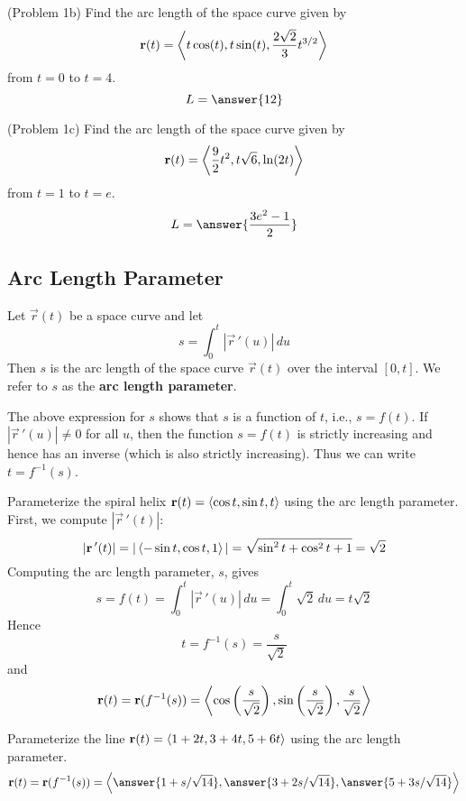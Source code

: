 \documentclass[handout]{ximera}
\begin{document}
\begin{problem}(Problem 1b)
Find the arc length of the space curve given by
\[
\mathbf r(t) = \left\langle t\cos(t), t\sin(t), \frac{2\sqrt 2}{3} t^{3/2}\right\rangle
\]
from $ t= 0$ to $t = 4$.
\[
L = \answer{12}
\]
\end{problem}


\begin{problem}(Problem 1c)
Find the arc length of the space curve given by
\[
\mathbf r(t) = \left\langle \frac92 t^2, t\sqrt 6, \ln(2t)\right\rangle
\]
from $ t= 1$ to $t = e$.
\[
L = \answer{\frac{3e^2 -1}{2}}
\]
\end{problem}




\subsection{Arc Length Parameter}

Let $\vec r(t) $ be a space curve and let 
\[
s = \int_0^t |\vec r\,'(u)| \, du
\]
Then $s$ is the arc length of the space curve $\vec r(t)$ over the interval $[0, t]$.
We refer to $s$ as the \textbf{arc length parameter}.

The above expression for $s$ shows that $s$ is a function of $t$, i.e., $s = f(t)$.
If $|\vec r\,'(u)| \neq 0$ for all $u$, then the function $s = f(t)$ is strictly increasing and hence has an inverse (which is also strictly increasing).
Thus we can write $t = f^{-1}(s)$.

\begin{example}[Example 2]
Parameterize the spiral helix $\mathbf r(t) = \left\langle \cos t, \sin t, t\right\rangle$ using the arc length parameter.\\
First, we compute $|\vec r\,'(t)|$:
\[
|\mathbf r\,'(t)| = |\left\langle -\sin t, \cos t, 1\right\rangle| = \sqrt{\sin^2 t + \cos^2 t + 1} = \sqrt 2
\]
Computing the arc length parameter, $s$, gives
\[
s = f(t) = \int_0^t |\vec r\,'(u)| \, du = \int_0^t \sqrt 2 \, du = t \sqrt 2
\]
Hence
\[
t = f^{-1}(s) = \frac{s}{\sqrt 2}
\]
and 
\[
\mathbf r(t) = \mathbf r(f^{-1}(s)) = \left\langle \cos \left(\frac{s}{\sqrt 2}\right), \sin \left(\frac{s}{\sqrt 2}\right),\frac{s}{\sqrt 2}\right\rangle
\]
\end{example}


\begin{problem}[Problem 2]
Parameterize the line $\mathbf r(t) =\left\langle 1+2t, 3+4t, 5+6t\right\rangle$ using the arc length parameter.
\[
\vec r(t) = \vec r(f^{-1}(s)) = \vector{\answer{1 + s/\sqrt{14}}, \answer{3 + 2s/\sqrt{14}}, \answer{5 + 3s/\sqrt{14}}}
\]
\end{problem}
\end{document}
